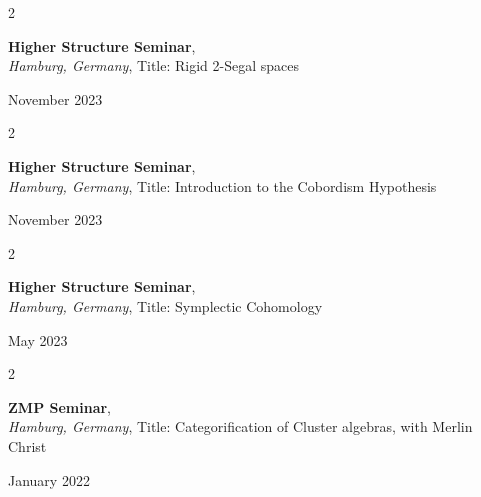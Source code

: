\documentclass[10pt, letterpaper]{article}
\newenvironment{twocolentry}[2][]{
    \onecolentry
    \def\secondColumn{#2}
    \setcolumnwidth{\fill, 4.5 cm}
    \begin{paracol}{2}
}{
    \switchcolumn \raggedleft \secondColumn
    \end{paracol}
    \endonecolentry
} %
\begin{document}
\vspace{0.2cm}

 \begin{twocolentry}{

    November 2023
           
        }
            \textbf{Higher Structure Seminar}, \\
            \textit{Hamburg, Germany},  Title: Rigid 2-Segal spaces
            
           
        \end{twocolentry}
        
 \vspace{0.2cm}
    
 \begin{twocolentry}{

    November 2023
           
        }
            \textbf{Higher Structure Seminar}, \\
            \textit{Hamburg, Germany},  Title: Introduction to the Cobordism Hypothesis
            
           
        \end{twocolentry}
        
 \vspace{0.2cm}

  \begin{twocolentry}{

    May 2023
           
        }
            \textbf{Higher Structure Seminar}, \\
            \textit{Hamburg, Germany},  Title: Symplectic Cohomology
            
           
        \end{twocolentry}
        
 \vspace{0.2cm}

 \begin{twocolentry}{

    January 2022
           
        }
            \textbf{ZMP Seminar}, \\
            \textit{Hamburg, Germany},  Title: Categorification of Cluster algebras, with Merlin Christ
            
           
        \end{twocolentry}
        
 \vspace{0.2cm}
\end{document}
